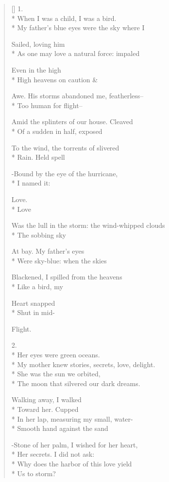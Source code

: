 \label{ch:as_a_child}
\settowidth{\versewidth}{Was the lull in the storm: the wind-whipped clouds}
\begin{verse}[\versewidth]
1.\\*
When I was a child, I was a bird.\\*
My father's blue eyes were the sky where I

Sailed, loving him\\*
As one may love a natural force: impaled

Even in the high \\*
High heavens on caution \& 

Awe. His storms abandoned me, featherless--\\*
Too human for flight--

Amid the splinters of our house. Cleaved\\*
Of a sudden in half, exposed

To the wind, the torrents of slivered\\*
Rain. Held spell

-Bound by the eye of the hurricane,\\*
I named it:

Love. \\*
Love

Was the lull in the storm: the wind-whipped clouds\\*
The sobbing sky

At bay. My father's eyes\\*
Were sky-blue: when the skies

Blackened, I spilled from the heavens\\*
Like a bird, my

Heart snapped\\*
Shut in mid-

Flight.

2.\\*
Her eyes were green oceans.\\*
My mother knew stories, secrets, love, delight.\\*
She was the sun we orbited,\\*
The moon that silvered our dark dreams.

Walking away, I walked\\*
Toward her. Cupped\\*
In her lap, measuring my small, water-\\*
Smooth hand against the sand

-Stone of her palm, I wished for her heart,\\*
Her secrets. I did not ask:\\*
Why does the harbor of this love yield\\*
Us to storm?


\end{verse}
